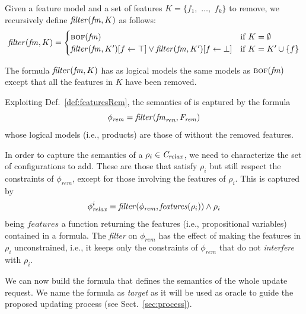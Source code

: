\begin{tikzborder}{\cite{Gargantini16:validation}}
\begin{tikzborder}{\cite{gargantini_combinatorial_2017}}
\begin{tikzborder}{\cite{garn2019}}
\begin{tikzborder}{\cite{arcaini2019achieving}}
	\begin{mydef}\label{def:featuresRem}
		\bb Given a feature model \fm and a set of features $K = \{f_1,$ $\ldots,$ $f_k\}$ to remove, we recursively define $\mathit{filter}(\mathit{fm}, K)$ as follows:\be
		\begin{equation*}
		\mathit{filter}(\mathit{fm}, K) =\begin{cases}
		\textsc{bof}(\mathit{fm}) & {\rm if} \; K = \emptyset\\
		\mathit{filter}(\mathit{fm}, K^\prime)[f \leftarrow \top] \vee \mathit{filter}(\mathit{fm}, K^\prime)[f \leftarrow \bot] & {\rm if} \; K = K^\prime \cup \{f\}\\
		\end{cases}
		\end{equation*}
	\end{mydef}
	
	\bb The formula $\mathit{filter}(\mathit{fm}, K)$ has as logical models the same models as $\textsc{bof}(\mathit{fm})$ except that all the features in $K$ have been removed.
	
	Exploiting Def.~\ref{def:featuresRem}, the semantics of \Frem is captured by the formula
	\[\phi_{\mathit{rem}} = \mathit{filter}(\mathit{fm}_{\mathit{ren}}, \mathit{F_{rem}})\] 
	whose logical models (i.e., products) are those of \fmrenamed without the removed features.
	
	In order to capture the semantics of a $\rho_i \in \mathit{C_{relax}}$, we need to characterize the set of configurations to add. These are those that satisfy $\rho_i$ but still respect the constraints of $\phi_{\mathit{rem}}$, except for those involving the features of $\rho_i$. This is captured by
	\[\phi^i_{\mathit{relax}} = \mathit{filter}(\phi_{\mathit{rem}}, \mathit{features}(\rho_i)) \wedge \rho_i\]
	being $\mathit{features}$ a function returning the features (i.e., propositional variables) contained in a formula. The {\it filter} on $\phi_{\mathit{rem}}$ has the effect of making the features in $\rho_i$ unconstrained, i.e., it keeps only the constraints of $\phi_{\mathit{rem}}$ that do not {\it interfere} with $\rho_i$.
	
	We can now build the formula that defines the semantics of the whole update request. We name the formula as {\it target} as it will be used as oracle to guide the proposed updating process (see Sect.~\ref{sec:process}).\be
	

\end{tikzborder}
\end{tikzborder}
\end{tikzborder}
\end{tikzborder}
